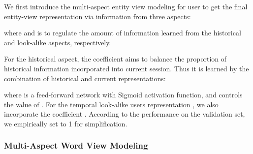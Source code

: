 \documentclass[sigconf,natbib=true]{acmart}
\begin{document}
We first introduce the multi-aspect entity view modeling for user  to get the final entity-view representation  via information from three aspects:

where  and  is to regulate the amount of information learned from the historical and look-alike aspects, respectively.

For the historical aspect, the coefficient  aims to balance the proportion of historical information incorporated into current session. Thus it is learned by the combination of historical and current representations:

where  is a feed-forward network with Sigmoid activation function, and  controls the value of .
For the temporal look-alike users representation , we also incorporate the coefficient . According to the performance on the validation set, we empirically set  to 1 for simplification.




\begin{comment}
We bring in a coefficient  to balance the proportion of historical information as:

where  is a feed-forward network with Sigmoid activation function, and  controls the value of . The temporal look-alike users are learned by Eq.~\ref{look_alike_entity}, and we use the look-alike user's representations  as supplements to modeling user . Here we also incorporate a coefficient  for look-alike users. It is empirically set to 1, according to the performance on the validation set.

In general, the knowledge view representation of user  is the combination of three aspects:

\textls[-12]{where  is all the users from training set, and  refers to Eq.~\ref{look_alike_entity}.}
\end{comment}


\begin{comment}
\textbf{Look-Alike Users.}
For each user , we search the temporal look-alike users from the whole training set, and adopt the cosine similarity function:

and  a clip function. Thus, only the users whose similarity is larger than 
would be used to enhance . Moreover, as  controls the proportion of look-alike users, the value of  is simply set to 1.
\end{comment}



\subsubsection{Multi-Aspect Word View Modeling}
\label{word_rep_section}
\end{document}
